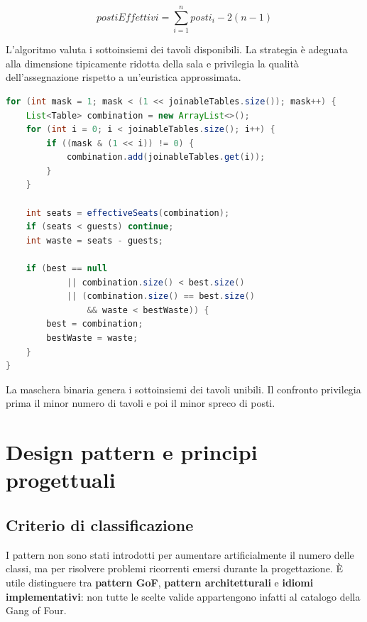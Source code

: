 \documentclass[12pt,a4paper]{article}
\begin{document}
\[
postiEffettivi =
\sum_{i=1}^{n} posti_i - 2(n-1)
\]

L'algoritmo valuta i sottoinsiemi dei tavoli disponibili. La strategia è
adeguata alla dimensione tipicamente ridotta della sala e privilegia la qualità
dell'assegnazione rispetto a un'euristica approssimata.

\begin{lstlisting}[style=codeStyle,language=Java,
caption={Selezione della combinazione migliore di tavoli.}]
for (int mask = 1; mask < (1 << joinableTables.size()); mask++) {
    List<Table> combination = new ArrayList<>();
    for (int i = 0; i < joinableTables.size(); i++) {
        if ((mask & (1 << i)) != 0) {
            combination.add(joinableTables.get(i));
        }
    }

    int seats = effectiveSeats(combination);
    if (seats < guests) continue;
    int waste = seats - guests;

    if (best == null
            || combination.size() < best.size()
            || (combination.size() == best.size()
                && waste < bestWaste)) {
        best = combination;
        bestWaste = waste;
    }
}
\end{lstlisting}

La maschera binaria genera i sottoinsiemi dei tavoli unibili. Il confronto
privilegia prima il minor numero di tavoli e poi il minor spreco di posti.

\section{Design pattern e principi progettuali}

\subsection{Criterio di classificazione}

I pattern non sono stati introdotti per aumentare artificialmente il numero
delle classi, ma per risolvere problemi ricorrenti emersi durante la
progettazione. È utile distinguere tra \textbf{pattern GoF}, \textbf{pattern
architetturali} e \textbf{idiomi implementativi}: non tutte le scelte valide
appartengono infatti al catalogo della Gang of Four.
\end{document}
